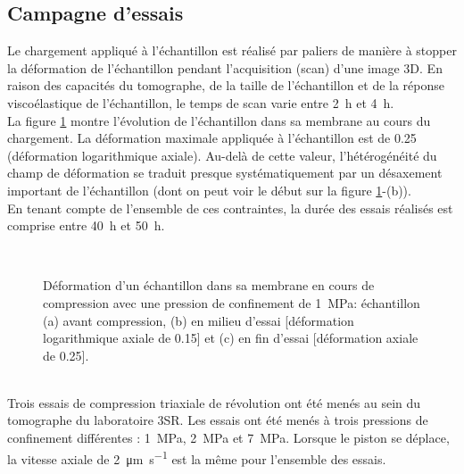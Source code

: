 	\subsection{Campagne d'essais}
		Le chargement appliqué à l'échantillon est réalisé par paliers de manière à stopper la déformation de l'échantillon pendant l'acquisition (scan) d'une image 3D. En raison des capacités du tomographe, de la taille de l'échantillon et de la réponse viscoélastique de l'échantillon, le temps de scan varie entre \SI{2}{\hour} et \SI{4}{\hour}.
		\\La figure \ref{fig04:geometries_membrane} montre l'évolution de l'échantillon dans sa membrane au cours du chargement. La déformation maximale appliquée à l'échantillon est de 0.25 (déformation logarithmique axiale). Au-delà de cette valeur, l'hétérogénéité du champ de déformation se traduit presque systématiquement par un désaxement important de l'échantillon (dont on peut voir le début sur la figure \ref{fig04:geometries_membrane}-(b)).
		\\En tenant compte de l'ensemble de ces contraintes, la durée des essais réalisés est comprise entre \SI{40}{\hour} et \SI{50}{\hour}.
		\begin{figure}\centering
			~\hfill
			\hfill
			\hfill
			\hfill~
			\caption{\label{fig04:geometries_membrane}Déformation d'un échantillon dans sa membrane en cours de compression avec une pression de confinement de \SI{1}{\mega\pascal}: échantillon (a) avant compression, (b) en milieu d'essai [déformation logarithmique axiale de \num{0.15}] et (c) en fin d'essai [déformation axiale de \num{0.25}].}
		\end{figure}
		\\Trois essais de compression triaxiale de révolution ont été menés au sein du tomographe du laboratoire 3SR. Les essais ont été menés à trois pressions de confinement différentes : \SI{1}{\mega\pascal}, \SI{2}{\mega\pascal} et \SI{7}{\mega\pascal}. Lorsque le piston se déplace, la vitesse axiale de \SI{2}{\micro\meter\per\second} est la même pour l'ensemble des essais.
